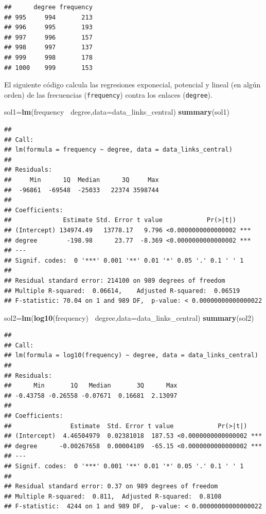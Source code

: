\documentclass[
]{article}
\newenvironment{Shaded}{\begin{snugshade}}{\end{snugshade}}
\newcommand{\DataTypeTok}[1]{\textcolor[rgb]{0.13,0.29,0.53}{#1}}
\newcommand{\KeywordTok}[1]{\textcolor[rgb]{0.13,0.29,0.53}{\textbf{#1}}}
\newcommand{\NormalTok}[1]{#1}
\newcommand{\OperatorTok}[1]{\textcolor[rgb]{0.81,0.36,0.00}{\textbf{#1}}}
\newcommand{\StringTok}[1]{\textcolor[rgb]{0.31,0.60,0.02}{#1}}
\begin{document}
\begin{verbatim}
##      degree frequency
## 995     994       213
## 996     995       193
## 997     996       157
## 998     997       137
## 999     998       178
## 1000    999       153
\end{verbatim}

El siguiente código calcula las regresiones exponecial, potencial y
lineal (en algún orden) de las frecuencias (\texttt{frequency}) contra
los enlaces (\texttt{degree}).

\begin{Shaded}
\begin{Highlighting}[]
\NormalTok{sol1=}\KeywordTok{lm}\NormalTok{(frequency}\OperatorTok{~}\StringTok{ }\NormalTok{degree,}\DataTypeTok{data=}\NormalTok{data_links_central)}
\KeywordTok{summary}\NormalTok{(sol1)}
\end{Highlighting}
\end{Shaded}

\begin{verbatim}
## 
## Call:
## lm(formula = frequency ~ degree, data = data_links_central)
## 
## Residuals:
##     Min      1Q  Median      3Q     Max 
##  -96861  -69548  -25033   22374 3598744 
## 
## Coefficients:
##              Estimate Std. Error t value            Pr(>|t|)    
## (Intercept) 134974.49   13778.17   9.796 <0.0000000000000002 ***
## degree        -198.98      23.77  -8.369 <0.0000000000000002 ***
## ---
## Signif. codes:  0 '***' 0.001 '**' 0.01 '*' 0.05 '.' 0.1 ' ' 1
## 
## Residual standard error: 214100 on 989 degrees of freedom
## Multiple R-squared:  0.06614,    Adjusted R-squared:  0.06519 
## F-statistic: 70.04 on 1 and 989 DF,  p-value: < 0.00000000000000022
\end{verbatim}

\begin{Shaded}
\begin{Highlighting}[]
\NormalTok{sol2=}\KeywordTok{lm}\NormalTok{(}\KeywordTok{log10}\NormalTok{(frequency)}\OperatorTok{~}\StringTok{ }\NormalTok{degree,}\DataTypeTok{data=}\NormalTok{data_links_central)}
\KeywordTok{summary}\NormalTok{(sol2)}
\end{Highlighting}
\end{Shaded}

\begin{verbatim}
## 
## Call:
## lm(formula = log10(frequency) ~ degree, data = data_links_central)
## 
## Residuals:
##      Min       1Q   Median       3Q      Max 
## -0.43758 -0.26558 -0.07671  0.16681  2.13097 
## 
## Coefficients:
##                Estimate  Std. Error t value            Pr(>|t|)    
## (Intercept)  4.46504979  0.02381018  187.53 <0.0000000000000002 ***
## degree      -0.00267658  0.00004109  -65.15 <0.0000000000000002 ***
## ---
## Signif. codes:  0 '***' 0.001 '**' 0.01 '*' 0.05 '.' 0.1 ' ' 1
## 
## Residual standard error: 0.37 on 989 degrees of freedom
## Multiple R-squared:  0.811,  Adjusted R-squared:  0.8108 
## F-statistic:  4244 on 1 and 989 DF,  p-value: < 0.00000000000000022
\end{verbatim}
\end{document}
